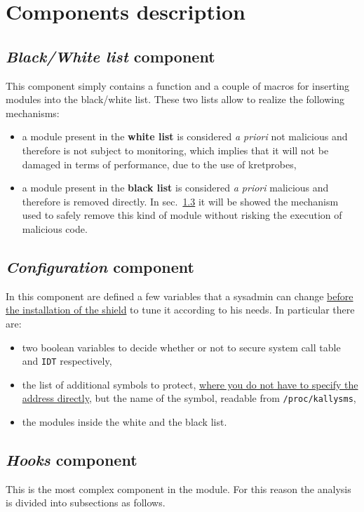 \documentclass{article}
\begin{document}
	\section{Components description}

	\subsection{\textsl{Black/White list} component}\label{sec:bwlist}
	This component simply contains a function and a couple of macros for inserting modules into the black/white list.
	These two lists allow to realize the following mechanisms:
	\begin{itemize}
		\item a module present in the \textbf{white list} is considered \textit{a priori} not malicious and therefore
		is not subject to monitoring, which implies that it will not be damaged in terms of performance, due to the use
		of kretprobes,
		\item a module present in the \textbf{black list} is considered \textit{a priori} malicious and therefore is
		removed directly. In sec.~\ref{sec:hooks} it will be showed the mechanism used to safely remove this kind of
		module without risking the execution of malicious code.
	\end{itemize}

	\subsection{\textsl{Configuration} component}\label{sec:config}
	In this component are defined a few variables that a sysadmin can change \ul{before the installation of the shield}
	to tune it according to his needs. In particular there are:
	\begin{itemize}
		\item two boolean variables to decide whether or not to secure system call table and \texttt{IDT} respectively,
		\item the list of additional symbols to protect, \ul{where you do not have to specify the address directly},
		but the name of the symbol, readable from \texttt{/proc/kallysms},
		\item the modules inside the white and the black list.
	\end{itemize}

	\subsection{\textsl{Hooks} component}\label{sec:hooks}
	This is the most complex component in the module. For this reason the analysis is divided into subsections as
	follows.
\end{document}
